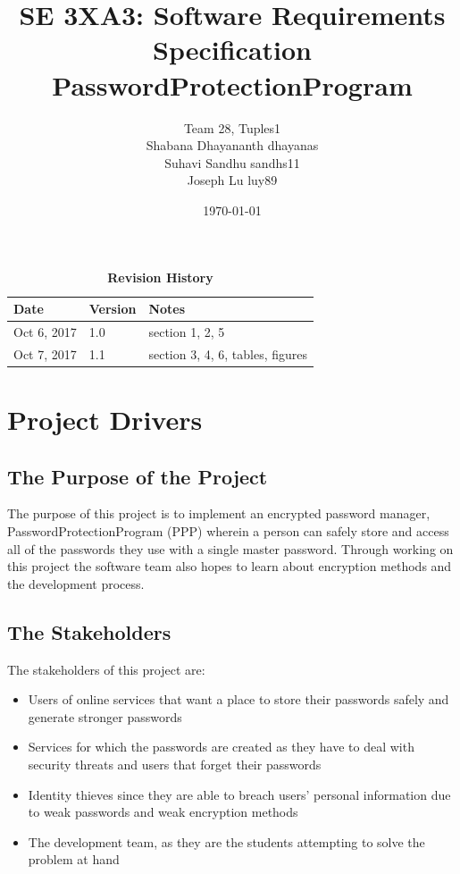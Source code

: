\documentclass[12pt, titlepage]{article}
\title{SE 3XA3: Software Requirements Specification\\PasswordProtectionProgram}
\author{Team 28, Tuples1
		\\ Shabana Dhayananth dhayanas
		\\  Suhavi Sandhu sandhs11
		\\ Joseph Lu luy89
}
\date{\today}
\begin{document}
\maketitle

\tableofcontents
\listoftables
\listoffigures

\begin{table}[bp]
\caption{\bf Revision History}
\begin{tabularx}{\textwidth}{p{3cm}p{2cm}X}
\toprule {\bf Date} & {\bf Version} & {\bf Notes}\\
\midrule
Oct 6, 2017 & 1.0 & section 1, 2, 5 \\
Oct 7, 2017 & 1.1 & section 3, 4, 6, tables, figures \\
\bottomrule
\end{tabularx}
\end{table}

\newpage


\section{Project Drivers}

\subsection{The Purpose of the Project}

The purpose of this project is to implement an encrypted password manager, PasswordProtectionProgram (PPP) wherein a person can 
safely store and access all of the passwords they use with a single master password. Through working on this project the software 
team also hopes to learn about encryption methods and the development process.

\subsection{The Stakeholders}

The stakeholders of this project are:
\begin{itemize}
\item Users of online services that want a place to store their passwords safely and generate stronger passwords
\item Services for which the passwords are created as they have to deal with security threats and users that forget their passwords
\item Identity thieves since they are able to breach users’ personal information due to weak passwords and weak encryption methods
\item The development team, as they are the students attempting to solve the problem at hand
\end{itemize}
\end{document}
